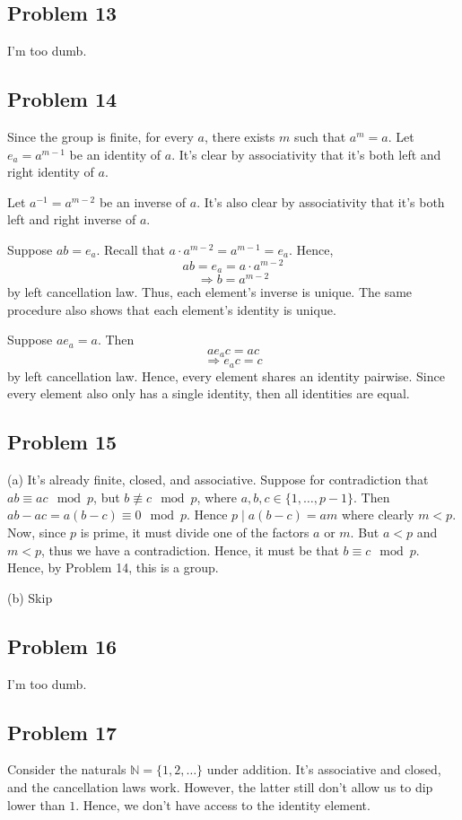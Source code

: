 \documentclass{book}
\begin{document}
\subsection*{Problem 13}
I'm too dumb.

\subsection*{Problem 14}
Since the group is finite, for every $a$, there exists $m$ such that $a^m = a$. Let $e_a = a^{m - 1}$ be an identity of $a$. It's clear by associativity that it's both left and right identity of $a$.

Let $a^{-1} = a^{m - 2}$ be an inverse of $a$. It's also clear by associativity that it's both left and right inverse of $a$.

Suppose $ab = e_a$. Recall that $a \cdot a^{m - 2} = a^{m - 1} = e_a$. Hence,
$$ab = e_a = a \cdot a^{m - 2}$$
$$\Rightarrow b = a^{m - 2}$$
by left cancellation law. Thus, each element's inverse is unique. The same procedure also shows that each element's identity is unique.

Suppose $a e_a = a$. Then
$$a e_a c = ac$$
$$\Rightarrow e_a c = c$$
by left cancellation law. Hence, every element shares an identity pairwise. Since every element also only has a single identity, then all identities are equal.

\subsection*{Problem 15}
(a)
It's already finite, closed, and associative. Suppose for contradiction that $ab \equiv ac \mod p$, but $b \not \equiv c \mod p$, where $a, b, c \in \{ 1, \ldots, p - 1\}$. Then $ab - ac = a(b - c) \equiv 0 \mod p$. Hence $p \mid a(b - c) = am$ where clearly $m < p$. Now, since $p$ is prime, it must divide one of the factors $a$ or $m$. But $a < p$ and $m < p$, thus we have a contradiction. Hence, it must be that $b \equiv c \mod p$. Hence, by Problem 14, this is a group.

\noindent
(b) Skip

\subsection*{Problem 16}
I'm too dumb.

\subsection*{Problem 17}
Consider the naturals $\mathbb{N} = \{1, 2, \ldots \}$ under addition. It's associative and closed, and the cancellation laws work. However, the latter still don't allow us to dip lower than $1$. Hence, we don't have access to the identity element.
\end{document}

